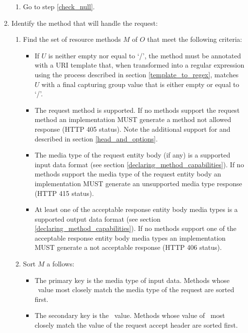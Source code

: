 \begin{enumerate}
\begin{enumerate}
\item Go to step \ref{check_null}.

\end{enumerate}

\item \label{find_method} Identify the method that will handle the request:

\begin{enumerate}
\item Find the set of resource methods $M$ of $O$ that meet the following criteria:
\begin{itemize}
\item If $U$ is neither empty nor equal to \lq/\rq, the method must be annotated with  a URI template that, when transformed into a regular expression using the process described in section \ref{template_to_regex}, matches $U$ with a final capturing group value that is either empty or equal to \lq/\rq.
\item The request method is supported. If no methods support the request method an implementation MUST generate a method not allowed response (HTTP 405 status). Note the additional support for  and  described in section \ref{head_and_options}.
\item The media type of the request entity body (if any) is a supported input data format (see section \ref{declaring_method_capabilities}). If no methods support the media type of the request entity body an implementation MUST generate an unsupported media type response (HTTP 415 status).
\item At least one of the acceptable response entity body media types is a supported output data format (see section \ref{declaring_method_capabilities}). If no methods support one of the acceptable response entity body media types an implementation MUST generate a not acceptable response (HTTP 406 status).
\end{itemize} 
\item Sort $M$ a follows:
\begin{itemize}
\item The primary key is the media type of input data. Methods whose \ConsumeMime\ value most closely match the media type of the request are sorted first.
\item The secondary key is the \ProduceMime\ value. Methods whose value of \ProduceMime\ most closely match the value of the request accept header are sorted first.
\end{itemize}


\end{enumerate}
\end{enumerate}
